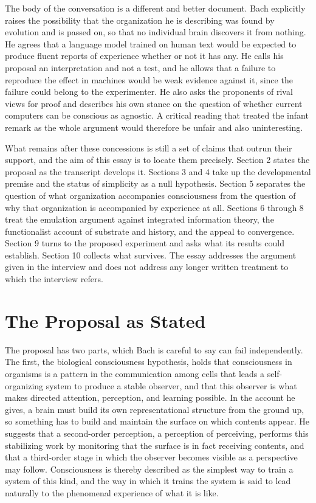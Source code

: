 \documentclass[11pt]{article}
\begin{document}
The body of the conversation is a different and better document. Bach explicitly raises the possibility that the organization he is describing was found by evolution and is passed on, so that no individual brain discovers it from nothing. He agrees that a language model trained on human text would be expected to produce fluent reports of experience whether or not it has any. He calls his proposal an interpretation and not a test, and he allows that a failure to reproduce the effect in machines would be weak evidence against it, since the failure could belong to the experimenter. He also asks the proponents of rival views for proof and describes his own stance on the question of whether current computers can be conscious as agnostic. A critical reading that treated the infant remark as the whole argument would therefore be unfair and also uninteresting.

What remains after these concessions is still a set of claims that outrun their support, and the aim of this essay is to locate them precisely. Section 2 states the proposal as the transcript develops it. Sections 3 and 4 take up the developmental premise and the status of simplicity as a null hypothesis. Section 5 separates the question of what organization accompanies consciousness from the question of why that organization is accompanied by experience at all. Sections 6 through 8 treat the emulation argument against integrated information theory, the functionalist account of substrate and history, and the appeal to convergence. Section 9 turns to the proposed experiment and asks what its results could establish. Section 10 collects what survives. The essay addresses the argument given in the interview and does not address any longer written treatment to which the interview refers.

\section{The Proposal as Stated}

The proposal has two parts, which Bach is careful to say can fail independently. The first, the biological consciousness hypothesis, holds that consciousness in organisms is a pattern in the communication among cells that leads a self-organizing system to produce a stable observer, and that this observer is what makes directed attention, perception, and learning possible. In the account he gives, a brain must build its own representational structure from the ground up, so something has to build and maintain the surface on which contents appear. He suggests that a second-order perception, a perception of perceiving, performs this stabilizing work by monitoring that the surface is in fact receiving contents, and that a third-order stage in which the observer becomes visible as a perspective may follow. Consciousness is thereby described as the simplest way to train a system of this kind, and the way in which it trains the system is said to lead naturally to the phenomenal experience of what it is like.
\end{document}
